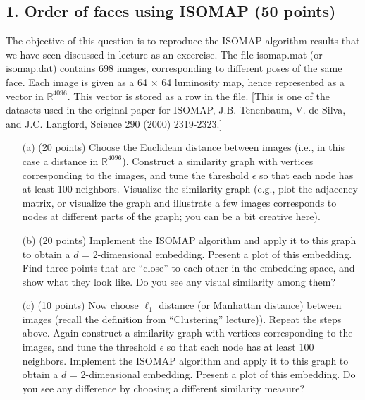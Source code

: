 \documentclass[twoside,12pt]{article}
\begin{document}
\subsection*{1. Order of faces using ISOMAP (50 points)}

The objective of this question is to reproduce the ISOMAP algorithm results that we have seen discussed in lecture as an excercise. The file \textsf{isomap.mat} (or \textsf{isomap.dat}) contains 698 images, corresponding to different poses of the same face. Each image is given as a 64 $\times$ 64 luminosity map, hence represented as a vector in $\mathbb R^{4096}$. This vector is stored as a row in the file. [This is one of the datasets used in the original paper for ISOMAP, J.B. Tenenbaum, V. de Silva, and J.C. Langford, Science 290 (2000) 2319-2323.]

\begin{enumerate} 
\item[(a)] (20 points) Choose the Euclidean distance between images (i.e., in this case a distance in $\mathbb R^{4096}$). Construct a similarity graph with vertices corresponding to the images, and tune the threshold $\epsilon$ so that each node has at least 100 neighbors. Visualize the similarity graph (e.g., plot the adjacency matrix, or visualize the graph and illustrate a few images corresponds to nodes at different parts of the graph; you can be a bit creative here).
 
\item[(b)] (20 points) Implement the ISOMAP algorithm and apply it to this graph to obtain a $d$ = 2-dimensional embedding. %
Present a plot of this embedding. Find three points that are ``close'' to each other in the embedding space, and show what they look like. Do you see any visual similarity among them?

\item[(c)] (10 points) Now choose $\ell_1$ distance (or Manhattan distance) between images (recall the definition from ``Clustering'' lecture)). Repeat the steps above. Again construct a similarity graph with vertices corresponding to the images, and tune the threshold $\epsilon$ so that each node has at least 100 neighbors. Implement the ISOMAP algorithm and apply it to this graph to obtain a $d$ = 2-dimensional embedding. Present a plot of this embedding.  Do you see any difference by choosing a different similarity measure? 

\end{enumerate}
\end{document}
